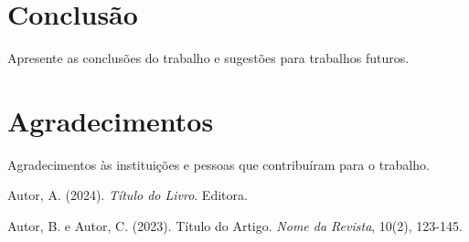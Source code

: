 \section{Conclusão}

Apresente as conclusões do trabalho e sugestões para trabalhos futuros.

\section{Agradecimentos}

Agradecimentos às instituições e pessoas que contribuíram para o trabalho.

\begin{thebibliography}{9}

Autor, A. (2024). \textit{Título do Livro}. Editora.

Autor, B. e Autor, C. (2023). Título do Artigo. \textit{Nome da Revista}, 10(2), 123-145.

\end{thebibliography}








